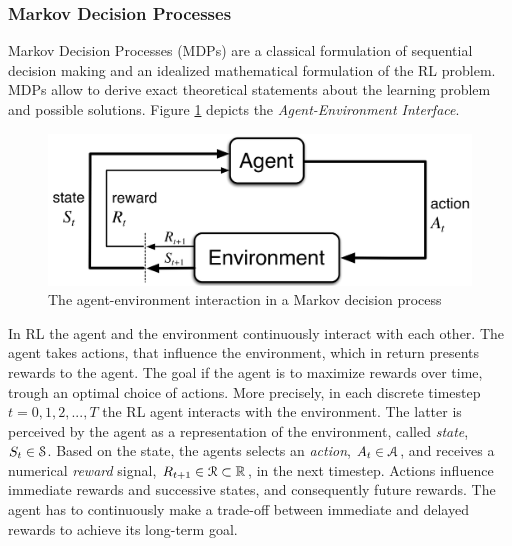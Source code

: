\documentclass[a4paper, twoside, 12pt]{article}
\let\cite\shortcite
\begin{document}
\subsubsection{Markov Decision Processes}
\label{sec:org01d6a94}
Markov Decision Processes (MDPs) are a classical formulation of sequential
decision making and an idealized mathematical formulation of the RL problem. MDPs
allow to derive exact theoretical statements about the learning problem and
possible solutions. Figure
\ref{agent-environment-interaction} depicts the \emph{Agent-Environment Interface}.
\begin{figure}[htbp]
\centering
\includegraphics[width=.9\linewidth]{./fig/mdp_interaction.png}
\caption[Markov Decision Process]{The agent-environment interaction in a Markov decision process \cite{sutton18_reinf} \label{agent-environment-interaction}}
\end{figure}
In RL the agent and the environment continuously interact with each other. The
agent takes actions, that influence the environment, which in return presents
rewards to the agent. The goal if the agent is to maximize rewards over time,
trough an optimal choice of actions. More precisely, in each discrete timestep
\(t\!=\!0,1,2,...,T\) the RL agent interacts with the environment. The latter is
perceived by the agent as a representation of the environment, called \emph{state}, \(S_t
\in \S\). Based on the state, the agents selects an \emph{action}, \(A_t\in\A\), and
receives a numerical \emph{reward} signal, \(R_{t+1}\in\R\subset\Re\), in the next
timestep. Actions influence immediate rewards and successive states, and
consequently future rewards. The agent has to continuously make a trade-off
between immediate and delayed rewards to achieve its long-term goal.
\end{document}
